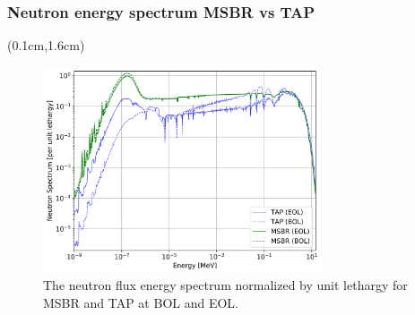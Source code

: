 \begin{frame}
\frametitle{Neutron energy spectrum MSBR vs TAP}
\begin{textblock*}{12.6cm}(0.1cm,1.6cm) %
	\begin{figure}[htp!] %
	\centerline{\includegraphics[width=0.73\textwidth]{../dissertation/figures/ch6/msbr_vs_tap_spectrum.png}}
		\vspace{-3mm}
	\caption{The neutron flux energy spectrum normalized by unit lethargy for 
	MSBR and TAP at BOL and EOL. }
	\end{figure}
\end{textblock*}
\end{frame}

